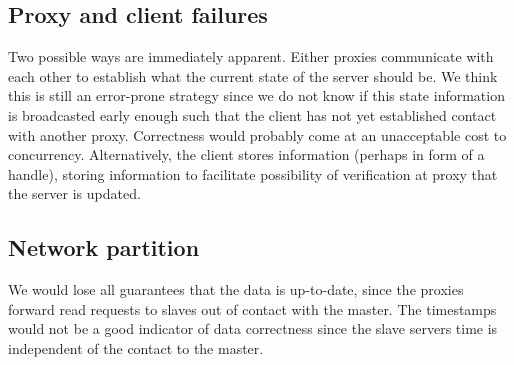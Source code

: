 \subsection{Proxy and client failures}
Two possible ways are immediately apparent. Either proxies communicate with
each other to establish what the current state of the server should be. We
think this is still an error-prone strategy since we do not know if this state
information is broadcasted early enough such that the client has not yet
established contact with another proxy. Correctness would probably come at an
unacceptable cost to concurrency. Alternatively, the client stores information
(perhaps in form of a handle), storing information to facilitate possibility
of verification at proxy that the server is updated.

\subsection{Network partition}
We would lose all guarantees that the data is up-to-date, since the proxies
forward read requests to slaves out of contact with the master. The timestamps
would not be a good indicator of data correctness since the slave servers time
is independent of the contact to the master.
